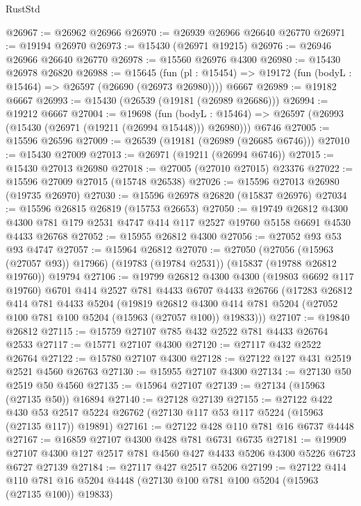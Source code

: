 \begin{lexlean}{RustStd}
\begin{coremodule}
{\begin{coremodule}
{{{{{{{{{{{{{{{{{{{{{{{{{{{{{{{{{{{{{{{{{{{{{{{{{{{{{{{{{{{{@26967 := @26962 @26966
@26970 := @26939 @26966 @26640 @26770
@26971 := @19194 @26970
@26973 := @15430 (@26971 @19215)
@26976 := @26946 @26966 @26640 @26770
@26978 := @15560 @26976 @4300
@26980 := @15430 @26978 @26820
@26988 := @15645
    (fun (pl : @15454) => @19172 (fun (bodyL : @15464) => @26597 (@26690 (@26973 @26980))))
    @6667
@26989 := @19182 @6667
@26993 := @15430 (@26539 (@19181 (@26989 @26686)))
@26994 := @19212 @6667
@27004 := @19698
    (fun (bodyL : @15464) => @26597 (@26993 (@15430 (@26971 (@19211 (@26994 @15448))) @26980)))
    @6746
@27005 := @15596 @26596
@27009 := @26539 (@19181 (@26989 (@26685 @6746)))
@27010 := @15430 @27009
@27013 := @26971 (@19211 (@26994 @6746))
@27015 := @15430 @27013 @26980
@27018 := @27005 (@27010 @27015) @23376
@27022 := @15596 @27009 @27015 (@15748 @26538)
@27026 := @15596 @27013 @26980 (@19735 @26970)
@27030 := @15596 @26978 @26820 (@15837 @26976)
@27034 := @15596 @26815 @26819 (@15753 @26653)
@27050 := @19749
    @26812
    @4300
    @4300
    @781
    @179
    @2531
    @4747
    @414
    @117
    @2527
    @19760
    @5158
    @6691
    @4530
    @4433
    @26768
@27052 := @15955 @26812 @4300
@27056 := @27052 @93 @53 @93 @4747
@27057 := @15964 @26812
@27070 := @27050
    (@27056 (@15963 (@27057 @93)) @17966)
    (@19783 (@19784 @2531))
    (@15837 (@19788 @26812 @19760))
    @19794
@27106 := @19799
    @26812
    @4300
    @4300
    (@19803 @6692 @117 @19760)
    @6701
    @414
    @2527
    @781
    @4433
    @6707
    @4433
    @26766
    (@17283
      @26812
      @414
      @781
      @4433
      @5204
      (@19819
        @26812
        @4300
        @414
        @781
        @5204
        (@27052 @100 @781 @100 @5204 (@15963 (@27057 @100)) @19833)))
@27107 := @19840 @26812
@27115 := @15759 @27107 @785 @432 @2522 @781 @4433 @26764 @2533
@27117 := @15771 @27107 @4300
@27120 := @27117 @432 @2522 @26764
@27122 := @15780 @27107 @4300
@27128 := @27122 @127 @431 @2519 @2521 @4560 @26763
@27130 := @15955 @27107 @4300
@27134 := @27130 @50 @2519 @50 @4560
@27135 := @15964 @27107
@27139 := @27134 (@15963 (@27135 @50)) @16894
@27140 := @27128 @27139
@27155 := @27122
    @422
    @430
    @53
    @2517
    @5224
    @26762
    (@27130 @117 @53 @117 @5224 (@15963 (@27135 @117)) @19891)
@27161 := @27122 @428 @110 @781 @16 @6737 @4448
@27167 := @16859 @27107 @4300 @428 @781 @6731 @6735
@27181 := @19909 @27107 @4300 @127 @2517 @781 @4560 @427 @4433 @5206 @4300 @5226 @6723 @6727 @27139
@27184 := @27117 @427 @2517 @5206
@27199 := @27122
    @414
    @110
    @781
    @16
    @5204
    @4448
    (@27130 @100 @781 @100 @5204 (@15963 (@27135 @100)) @19833)
}}}}}}}}}}}}}}}}}}}}}}}}}}}}}}}}}}}}}}}}}}}}}}}}}}}}}}}}}}}}
\end{coremodule}}
\end{coremodule}
\end{lexlean}
